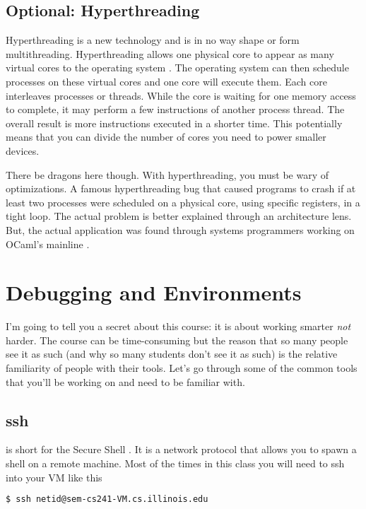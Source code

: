 \subsection{Optional: Hyperthreading}

Hyperthreading is a new technology and is in no way shape or form multithreading.
Hyperthreading allows one physical core to appear as many virtual cores to the operating system \cite[P.51]{guide2011intel}.
The operating system can then schedule processes on these virtual cores and one core will execute them.
Each core interleaves processes or threads.
While the core is waiting for one memory access to complete, it may perform a few instructions of another process thread.
The overall result is more instructions executed in a shorter time.
This potentially means that you can divide the number of cores you need to power smaller devices.

There be dragons here though.
With hyperthreading, you must be wary of optimizations.
A famous hyperthreading bug that caused programs to crash if at least two processes were scheduled on a physical core, using specific registers, in a tight loop.
The actual problem is better explained through an architecture lens.
But, the actual application was found through systems programmers working on OCaml's mainline \cite{leroy_2017}.

\section{Debugging and Environments}

I'm going to tell you a secret about this course: it is about working smarter \textit{not} harder.
The course can be time-consuming but the reason that so many people see it as such (and why so many students don't see it as such) is the relative familiarity of people with their tools.
Let's go through some of the common tools that you'll be working on and need to be familiar with.

\subsection{ssh}

 is short for the Secure Shell \cite{openbsd_ssh}.
It is a network protocol that allows you to spawn a shell on a remote machine.
Most of the times in this class you will need to ssh into your VM like this

\begin{lstlisting}[language=bash]
$ ssh netid@sem-cs241-VM.cs.illinois.edu
\end{lstlisting}

